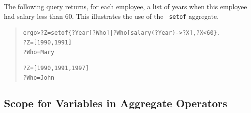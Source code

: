 \documentclass[11pt]{article}
\newcommand{\prompt}{ergo> }
\begin{document}
The following query returns, for each employee, a list of years when this
employee had salary less than 60. This illustrates the use of the {\tt
  setof} aggregate.
\begin{quote}
\begin{alltt}
\prompt ?Z = setof\{?Year[?Who]|?Who[salary(?Year)->?X], ?X < 60\}.
?Z = [1990,1991]
?Who = Mary

?Z = [1990,1991,1997]
?Who = John
\end{alltt}
\end{quote}



\subsection{Scope for Variables in Aggregate Operators}
\end{document}
